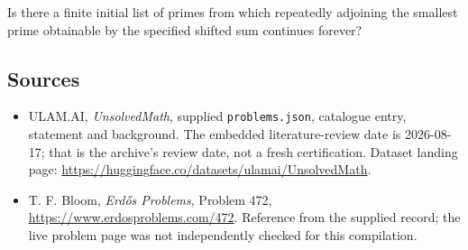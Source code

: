 \documentclass[11pt,a4paper]{article}
\begin{document}
Is there a finite initial list of primes from which repeatedly adjoining the smallest prime obtainable by the specified shifted sum continues forever?

\subsection{Sources}

{\small

\begin{itemize}

\item[\hypertarget{source:statement:1}{S1}] ULAM.AI, \emph{UnsolvedMath}, supplied \texttt{problems.json}, catalogue entry, statement and background. The embedded literature-review date is 2026-08-17; that is the archive’s review date, not a fresh certification. Dataset landing page: \url{https://huggingface.co/datasets/ulamai/UnsolvedMath}.

\item[\hypertarget{source:statement:2}{S2}] T. F. Bloom, \emph{Erdős Problems}, Problem 472, \url{https://www.erdosproblems.com/472}. Reference from the supplied record; the live problem page was not independently checked for this compilation.

\end{itemize}

}

\label{end:statement}
\end{document}
